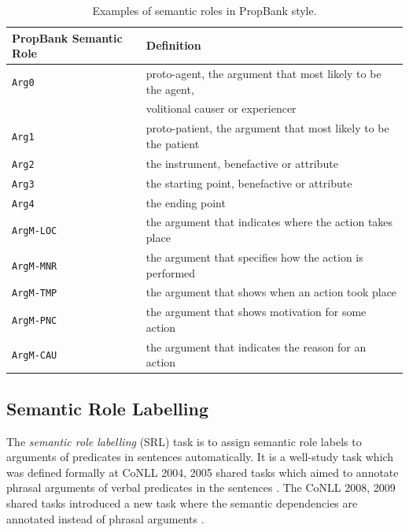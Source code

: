 \documentclass[a4paper]{article}
\begin{document}
\begin{table}[t]
\centering
\begin{tabular}{ll} 
\textbf{PropBank Semantic Role}  &   \textbf{Definition} \\ \hline
\texttt{Arg0}                    &   proto-agent, the argument that most likely to be the agent, \\ 
                                 &   volitional causer or experiencer \\ 
\texttt{Arg1}                    &   proto-patient, the argument that most likely to be the patient \\ 
\texttt{Arg2}                    &   the instrument, benefactive or attribute \\ 
\texttt{Arg3}                    &   the starting point, benefactive or attribute \\ 
\texttt{Arg4}                    &   the ending point \\ 
\texttt{ArgM-LOC}                &   the argument that indicates where the action takes place \\ 
\texttt{ArgM-MNR}                &   the argument that specifies how the action is performed \\ 
\texttt{ArgM-TMP}                &   the argument that shows when an action took place \\ 
\texttt{ArgM-PNC}                &   the argument that shows motivation for some action \\ 
\texttt{ArgM-CAU}                &   the argument that indicates the reason for an action \\ 
\end{tabular}
\caption{\label{tab:propbank} Examples of semantic roles in PropBank style.}
\end{table}
% 
% 
% 
% 
% 
%


\subsection{Semantic Role Labelling} \label{sec:srl}
The \textit{semantic role labelling} (SRL) task is to assign semantic role labels to arguments of predicates in sentences automatically. It is a well-study task which was defined formally at CoNLL 2004, 2005 shared tasks which aimed to annotate phrasal arguments of verbal predicates in the sentences \citep{carreras-marquez:2004:CONLL, carreras-marquez:2005:CoNLL}. The CoNLL 2008, 2009 shared tasks introduced a new task where the semantic dependencies are annotated instead of phrasal arguments \citep{surdeanu-EtAl:2008:CONLL, hajivc-EtAl:2009:CoNLL-2009-ST}. 
\end{document}
